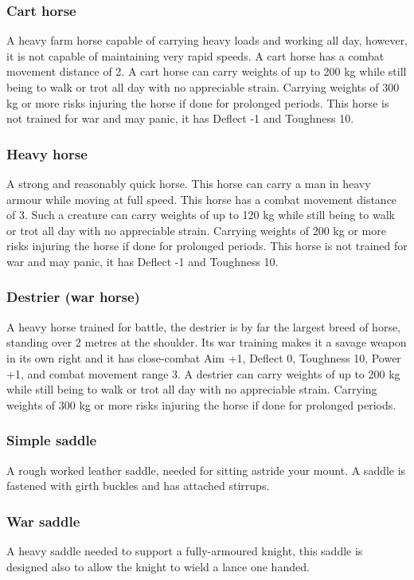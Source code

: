 \documentclass[a4paper,11pt,oneside]{book}
\begin{document}
\subsubsection{Cart horse}
A heavy farm horse capable of carrying heavy loads and working all day, however, it is not capable of maintaining very rapid speeds. A cart horse has a combat movement distance of 2. A cart horse can carry weights of up to 200 kg while still being to walk or trot all day with no appreciable strain. Carrying weights of 300 kg or more risks injuring the horse if done for prolonged periods. This horse is not trained for war and may panic, it has Deflect -1 and Toughness 10.

\subsubsection{Heavy horse}
A strong and reasonably quick horse. This horse can carry a man in heavy armour while moving at full speed. This horse has a combat movement distance of 3. Such a creature can carry weights of up to 120 kg while still being to walk or trot all day with no appreciable strain. Carrying weights of 200 kg or more risks injuring the horse if done for prolonged periods. This horse is not trained for war and may panic, it has Deflect -1 and Toughness 10.

\subsubsection{Destrier (war horse)}
A heavy horse trained for battle, the destrier is by far the largest breed of horse, standing over 2 metres at the shoulder. Its war training makes it a savage weapon in its own right and it has close-combat Aim +1, Deflect 0, Toughness 10, Power +1, and combat movement range 3. A destrier can carry weights of up to 200 kg while still being to walk or trot all day with no appreciable strain. Carrying weights of 300 kg or more risks injuring the horse if done for prolonged periods.

\subsubsection{Simple saddle}
A rough worked leather saddle, needed for sitting astride your mount. A saddle is fastened with girth buckles and has attached stirrups.

\subsubsection{War saddle}
A heavy saddle needed to support a fully-armoured knight, this saddle is designed also to allow the knight to wield a lance one handed.
\end{document}
